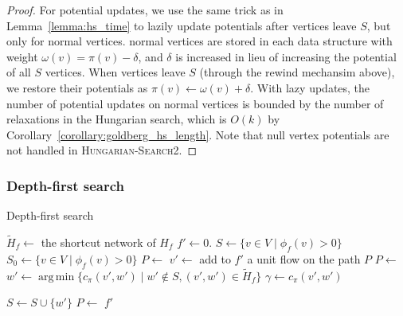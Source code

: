\documentclass[11pt]{article}
\DeclareMathOperator*{\argmin}{arg\,min}
\def\fsupply{\phi}
\theoremstyle{plain}
\numberwithin{figure}{section}
\begin{document}
\begin{proof}
For potential updates, we use the same trick as in Lemma~\ref{lemma:hs_time} to
lazily update potentials after vertices leave $S$, but only for normal
vertices.
normal vertices are stored in each data structure with weight
$\omega(v) = \pi(v) - \delta$, and $\delta$ is increased in lieu of increasing
the potential of all $S$ vertices.
When vertices leave $S$ (through the rewind mechansim above), we restore
their potentials as $\pi(v) \gets \omega(v) + \delta$.
With lazy updates, the number of potential updates on normal vertices is
bounded by the number of relaxations in the Hungarian search, which is $O(k)$
by Corollary~\ref{corollary:goldberg_hs_length}.
Note that null vertex potentials are not handled in
\textsc{Hungarian-Search2}.
\end{proof}

\subsubsection{Depth-first search}

\begin{algorithm}
\caption{Depth-first search}
\label{algorithm:goldberg_dfs}
\begin{algorithmic}[1]
	\State $\tilde{H}_f \gets$ the shortcut network of $H_f$
	\State $f' \gets 0$.
	\State $S \gets \{v \in V \mid \fsupply_f(v) > 0\}$
	\State $S_0 \gets \{v \in V \mid \fsupply_f(v) > 0\}$
	\State $P \gets$ 
	\Repeat
		\State $v' \gets$ 
		\If{$\fsupply_f(v') < 0$}
			\State add to $f'$ a unit flow on the path $P$
			\State $P \gets$ 
		\Else
			\State $w' \gets \argmin\{c_\pi(v', w') \mid w' \not\in S, (v', w') \in \tilde{H}_f\}$
			\State $\gamma \gets c_\pi(v', w')$

				\State $S \gets S \cup \{w'\}$
				\State $P \gets$ 
			\Else
				\State {}
			\EndIf
		\EndIf
	\State\Return $f'$
\EndFunction
\end{algorithmic}
\end{algorithm}
\end{document}

